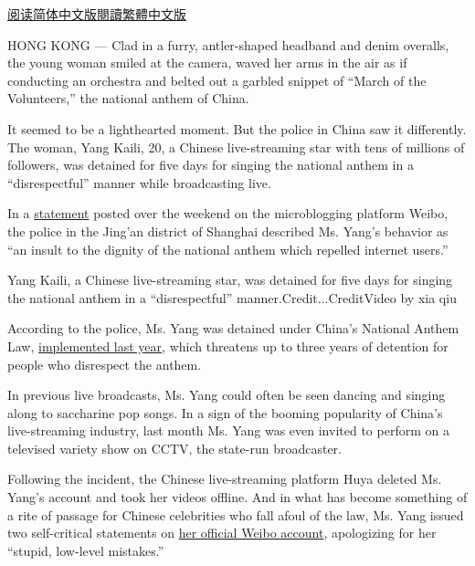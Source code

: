 \href{https://cn.nytimes.com/china/20181017/china-yang-kaili-anthem/}{阅读简体中文版}\href{https://cn.nytimes.com/china/20181017/china-yang-kaili-anthem/zh-hant/}{閱讀繁體中文版}

HONG KONG --- Clad in a furry, antler-shaped headband and denim
overalls, the young woman smiled at the camera, waved her arms in the
air as if conducting an orchestra and belted out a garbled snippet of
``March of the Volunteers,'' the national anthem of China.

It seemed to be a lighthearted moment. But the police in China saw it
differently. The woman, Yang Kaili, 20, a Chinese live-streaming star
with tens of millions of followers, was detained for five days for
singing the national anthem in a ``disrespectful'' manner while
broadcasting live.

In a
\href{https://www.weibo.com/1589614077/GDMdawDuo?from=page_1001061589614077_profile\&wvr=6\&mod=weibotime}{statement}
posted over the weekend on the microblogging platform Weibo, the police
in the Jing'an district of Shanghai described Ms. Yang's behavior as
``an insult to the dignity of the national anthem which repelled
internet users.''

Yang Kaili, a Chinese live-streaming star, was detained for five days
for singing the national anthem in a ``disrespectful''
manner.Credit...CreditVideo by xia qiu

According to the police, Ms. Yang was detained under China's National
Anthem Law,
\href{https://www.nytimes.com/2017/11/04/world/asia/china-hong-kong-national-anthem.html}{implemented
last year}, which threatens up to three years of detention for people
who disrespect the anthem.

In previous live broadcasts, Ms. Yang could often be seen dancing and
singing along to saccharine pop songs. In a sign of the booming
popularity of China's live-streaming industry, last month Ms. Yang was
even invited to perform on a televised variety show on CCTV, the
state-run broadcaster.

Following the incident, the Chinese live-streaming platform Huya deleted
Ms. Yang's account and took her videos offline. And in what has become
something of a rite of passage for Chinese celebrities who fall afoul of
the law, Ms. Yang issued two self-critical statements on
\href{https://www.weibo.com/5195037706/GDaRg9k1k?from=page_1005055195037706_profile\&wvr=6\&mod=weibotime}{her
official Weibo account}, apologizing for her ``stupid, low-level
mistakes.''

